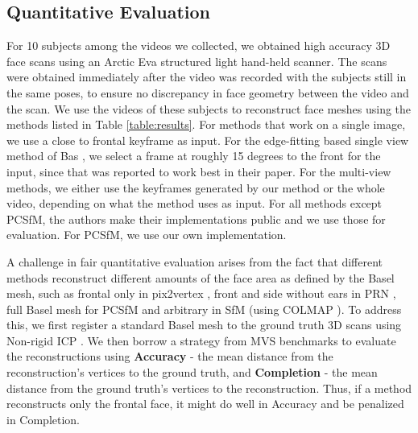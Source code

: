 \documentclass[10pt,twocolumn,letterpaper]{article}
\begin{document}
\subsection{Quantitative Evaluation} \label{sec:quant}

For 10 subjects among the videos we collected, we obtained high accuracy 3D face scans using an Arctic Eva structured light hand-held scanner. The scans were obtained immediately after the video was recorded with the subjects still in the same poses, to ensure no discrepancy in face geometry between the video and the scan. We use the videos of these subjects to reconstruct face meshes using the methods listed in Table \ref{table:results}. For methods that work on a single image, we use a close to frontal keyframe as input. For the edge-fitting based single view method of Bas \etal \cite{bas2016fitting}, we select a frame at roughly 15 degrees to the front for the input, since that was reported to work best in their paper. For the multi-view methods, we either use the keyframes generated by our method or the whole video, depending on what the method uses as input.
For all methods except PCSfM, the authors make their implementations public and we use those for evaluation. For PCSfM, we use our own implementation.

A challenge in fair quantitative evaluation arises from the fact that different methods reconstruct different amounts of the face area as defined by the Basel mesh, such as frontal only in pix2vertex \cite{sela2017unrestricted} , front and side without ears in PRN \cite{feng2018joint}, full Basel mesh for PCSfM \cite{hernandez2017accurate} and arbitrary in SfM (using COLMAP \cite{schonberger2016structure}). To address this, we first register a standard Basel mesh to the ground truth 3D scans using Non-rigid ICP \cite{amberg2007optimal,booth2018large}. We then borrow a strategy from MVS benchmarks \cite{jensen2014large,knapitsch2017tanks,yao2018mvsnet} to evaluate the reconstructions using \textbf{Accuracy} - the mean distance from the reconstruction's vertices to the ground truth, and \textbf{Completion} - the mean distance from the ground truth's vertices to the reconstruction. Thus, if a method reconstructs only the frontal face, it might do well in Accuracy and be penalized in Completion.
\end{document}
